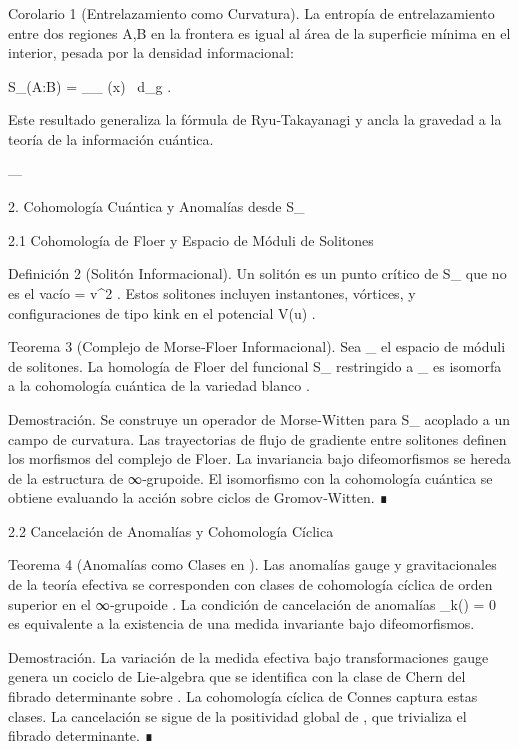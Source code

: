 \documentclass[12pt,twoside]{book}
\begin{document}
Corolario 1 (Entrelazamiento como Curvatura). La entropía de entrelazamiento entre dos regiones  A,B  en la frontera es igual al área de la superficie mínima en el interior, pesada por la densidad informacional:

S_{}(A:B) =  \int_{\Sigma_{\min}} \rho(x) \, d_g .

Este resultado generaliza la fórmula de Ryu‑Takayanagi y ancla la gravedad a la teoría de la información cuántica.

---

2. Cohomología Cuántica y Anomalías desde  S_{} 

2.1 Cohomología de Floer y Espacio de Móduli de Solitones

Definición 2 (Solitón Informacional). Un solitón es un punto crítico de  S_{}  que no es el vacío  \rho = v^2 . Estos solitones incluyen instantones, vórtices, y configuraciones de tipo kink en el potencial  V(u) .

Teorema 3 (Complejo de Morse‑Floer Informacional). Sea  _{}  el espacio de móduli de solitones. La homología de Floer del funcional  S_{}  restringido a  _{}  es isomorfa a la cohomología cuántica de la variedad blanco   .

Demostración. Se construye un operador de Morse‑Witten para  S_{}  acoplado a un campo de curvatura. Las trayectorias de flujo de gradiente entre solitones definen los morfismos del complejo de Floer. La invariancia bajo difeomorfismos se hereda de la estructura de ∞‑grupoide. El isomorfismo con la cohomología cuántica se obtiene evaluando la acción sobre ciclos de Gromov‑Witten. ∎

2.2 Cancelación de Anomalías y Cohomología Cíclica

Teorema 4 (Anomalías como Clases en   ). Las anomalías gauge y gravitacionales de la teoría efectiva se corresponden con clases de cohomología cíclica de orden superior en el ∞‑grupoide   . La condición de cancelación de anomalías  _k() = 0  es equivalente a la existencia de una medida  \rho  invariante bajo difeomorfismos.

Demostración. La variación de la medida efectiva bajo transformaciones gauge genera un cociclo de Lie-algebra que se identifica con la clase de Chern del fibrado determinante sobre   . La cohomología cíclica de Connes captura estas clases. La cancelación se sigue de la positividad global de  \rho , que trivializa el fibrado determinante. ∎
\end{document}
